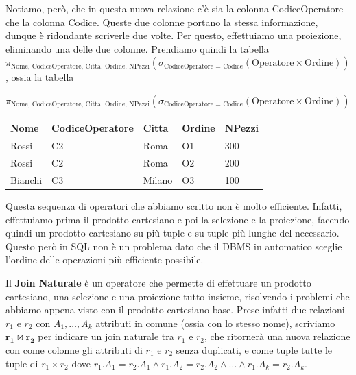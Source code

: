\documentclass[11pt, a4paper, titlepage, oneside]{scrbook}
\begin{document}
Notiamo, però, che in questa nuova relazione c'è sia la colonna CodiceOperatore che la colonna Codice. Queste due colonne portano la stessa informazione, dunque è ridondante scriverle due volte. Per questo, effettuiamo una proiezione, eliminando una delle due colonne. Prendiamo quindi la tabella $\pi_{\text{Nome, CodiceOperatore, Citta, Ordine, NPezzi}}(\sigma_{\text{CodiceOperatore = Codice}}(\text{Operatore} \times \text{Ordine}))$, ossia la tabella

\begin{center}
$\pi_{\text{Nome, CodiceOperatore, Citta, Ordine, NPezzi}}(\sigma_{\text{CodiceOperatore = Codice}}(\text{Operatore} \times \text{Ordine}))$

\begin{tabular}{|l|l|l|l|l|}
\hline
\textbf{Nome} & \textbf{CodiceOperatore} & \textbf{Citta} &\textbf{Ordine}  & \textbf{NPezzi} \\ \hline
Rossi & C2 & Roma & O1 & 300 \\
Rossi & C2 & Roma & O2 & 200 \\
Bianchi & C3 & Milano & O3 & 100 \\ \hline
\end{tabular}
\end{center}

\NB Questa sequenza di operatori che abbiamo scritto non è molto efficiente. Infatti, effettuiamo prima il prodotto cartesiano e poi la selezione e la proiezione, facendo quindi un prodotto cartesiano su più tuple e su tuple più lunghe del necessario. Questo però in SQL non è un problema dato che il DBMS in automatico sceglie l'ordine delle operazioni più efficiente possibile.

\begin{Definizione} 
\label{def-join-Naturale} 
Il \textbf{Join Naturale} è un operatore che permette di effettuare un prodotto cartesiano, una selezione e una proiezione tutto insieme, risolvendo i problemi che abbiamo appena visto con il prodotto cartesiano base. Prese infatti due relazioni $r_1$ e $r_2$ con $A_1, \ldots, A_k$ attributi in comune (ossia con lo stesso nome), scriviamo $\bm{r_1 \bowtie r_2}$ per indicare un join naturale tra $r_1$ e $r_2$, che ritornerà una nuova relazione con come colonne gli attributi di $r_1$ e $r_2$ senza duplicati, e come tuple tutte le tuple di $r_1 \times r_2$ dove $r_1.A_1 = r_2.A_1 \land r_1.A_2 = r_2.A_2 \land \ldots \land r_1.A_k = r_2.A_k$. 
\end{Definizione}
\end{document}
